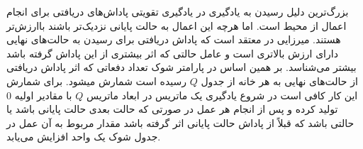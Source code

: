 بزرگ‌ترین دلیل رسیدن به یادگیری در یادگیری تقویتی پاداش‌های دریافتی برای انجام اعمال از محیط است. اما هرچه این اعمال به حالت پایانی نزدیک‌تر باشند باارزش‌تر هستند. میرزایی در معتقد است که پاداش دریافتی برای رسیدن به حالت‌های نهایی دارای ارزش بالاتری است و عامل حالتی که اثر بیشتری از این پاداش گرفته باشد بیشتر می‌شناسد. بر همین اساس در پارامتر شوک تعداد دفعاتی که اثر پاداش دریافتی از حالت‌های نهایی به هر خانه از جدول $Q$ رسیده است شمارش میشود. برای شمارش این کار کافی است در شروع یادگیری یک ماتریس در ابعاد ماتریس $Q$ با مقادیر اولیه 0 تولید کرده و پس از انجام هر عمل در صورتی که حالت بعدی حالت پایانی باشد یا حالتی باشد که قبلاً از پاداش حالت پایانی اثر گرفته باشد مقدار مربوط به آن عمل در جدول شوک یک واحد افزایش می‌یابد.